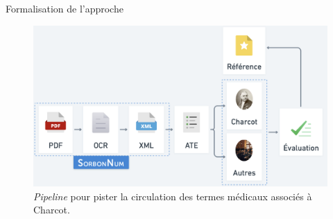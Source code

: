 \begin{frame}{Formalisation de l'approche}
	\begin{figure}[h]
		\includegraphics[width=\linewidth]{pic/formalisation_approche.png}
		\caption{\textit{Pipeline} pour pister la circulation des termes médicaux associés à Charcot.}
		\label{fig:ling_out_TAL}
	\end{figure}
\end{frame}



